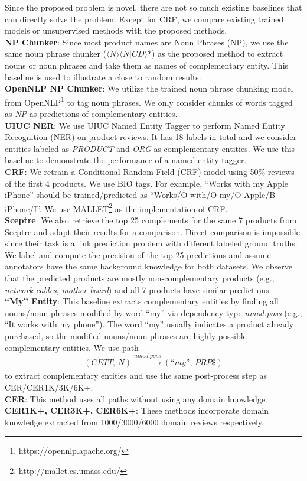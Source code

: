 Since the proposed problem is novel, there are not so much existing baselines that can directly solve the problem. Except for CRF, we compare existing trained models or unsupervised methods with the proposed methods.\\
\textbf{NP Chunker}: Since most product names are Noun Phrases (NP), we use the same noun phrase chunker ($\langle \textit{N} \rangle \langle \textit{N}\vert \textit{CD} \rangle \textit{*}$) as the proposed method to extract nouns or noun phrases and take them as names of complementary entity. This baseline is used to illustrate a close to random results.\\
\textbf{OpenNLP NP Chunker}: We utilize the trained noun phrase chunking model from OpenNLP\footnote{https://opennlp.apache.org/} to tag noun phrases. We only consider chunks of words tagged as \textit{NP} as predictions of complementary entities.\\
\textbf{UIUC NER}: We use UIUC Named Entity Tagger \cite{ratinov2009design} to perform Named Entity Recognition (NER) on product reviews. It has 18 labels in total and we consider entities labeled as \textit{PRODUCT} and \textit{ORG} as complementary entities. We use this baseline to demonstrate the performance of a named entity tagger.\\
\textbf{CRF}: We retrain a Conditional Random Field (CRF) model using 50\% reviews of the first 4 products. We use BIO tags. For example, ``Works with my Apple iPhone'' should be trained/predicted as ``Works/O with/O my/O Apple/B iPhone/I''. We use MALLET\footnote{http://mallet.cs.umass.edu/} as the implementation of CRF.\\
\textbf{Sceptre}: We also retrieve the top 25 complements for the same 7 products from Sceptre \cite{McAPanLes15} and adapt their results for a comparison. Direct comparison is impossible since their task is a link prediction problem with different labeled ground truths. We label and compute the precision of the top 25 predictions and assume annotators have the same background knowledge for both datasets. We observe that the predicted products are mostly non-complementary products (e.g., \textit{network cables}, \textit{mother board}) and all 7 products have similar predictions.\\
\textbf{``My'' Entity}: This baseline extracts complementary entities by finding all nouns/noun phrases modified by word ``my'' via dependency type \textit{nmod:poss} (e.g., ``It works with my phone''). The word ``my'' usually indicates a product already purchased, so the modified nouns/noun phrases are highly possible complementary entities. We use path
$$(\textit{CETT, N})\xrightarrow[]{\textit{nmod:poss}}(\textit{``my'', PRP\$})$$
to extract complementary entities and use the same post-process step as CER/CER1K/3K/6K+. \\
\textbf{CER}: This method uses all paths without using any domain knowledge.\\
\textbf{CER1K+, CER3K+, CER6K+}: These methods incorporate domain knowledge extracted from 1000/3000/6000 domain reviews respectively.

